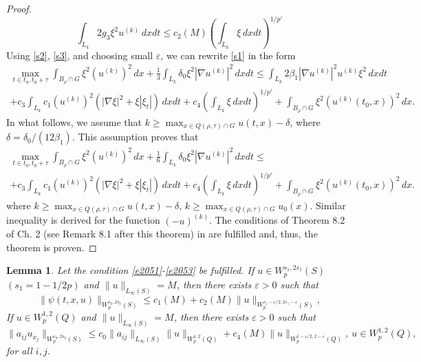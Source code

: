 \documentclass{article}
\theoremstyle{plain}
\newtheorem{lemma}{Lemma}
\begin{document}
\begin{proof}
\begin{equation}\label{s3}
\int_{L_k} 2g_3\xi^2  u^{(k)} \,dxdt\leq c_2(M)  (\int_{L_k}\xi\,dxdt )^{1/p'}
\end{equation} 
Using  \eqref{s2},   \eqref{s3}, and choosing small  $\varepsilon$, we can rewrite   \eqref{s1} in the form 
\begin{multline}\label{s4}
\max_{t\in t_0,t_0+\tau} \int_{B_\rho\cap G}\xi^2 (u^{(k)})^2\,dx +
\frac{1}{3} \int_{L_k} \delta_0\xi^2 |\nabla u^{(k)}|^2\,dxdt \leq 
\int_{L_k} 2\beta_1|\nabla u^{(k)}|^2 u^{(k)}\xi^2\,dxdt \\
+ c_3\int_{L_k} c_1(u^{(k)})^2(|\nabla \xi|^2+\xi|\xi_t|) \,dxdt + c_4(\int_{L_k}\xi\,dxdt )^{1/p'}+\int_{B_\rho\cap G}\xi^2 (u^{(k)}(t_0,x))^2\,dx.
\end{multline}
In what follows,   we assume that   $k\geq \max_{x\in Q(\rho,\tau)\cap G}u(t,x)-\delta$, where $\delta=\delta_0/(12\beta_1)$. This assumption proves that
\begin{multline*}
\max_{t\in t_0,t_0+\tau} \int_{B_\rho\cap G}\xi^2 (u^{(k)})^2\,dx +
\frac{1}{6} \int_{L_k} \delta_0\xi^2 |\nabla u^{(k)}|^2\,dxdt \leq \\
+ c_3\int_{L_k} c_1(u^{(k)})^2(|\nabla \xi|^2+\xi|\xi_t|) \,dxdt + c_4(\int_{L_k}\xi\,dxdt )^{1/p'}+\int_{B_\rho\cap G}\xi^2 (u^{(k)}(t_0,x))^2\,dx.
\end{multline*}
where $k\geq \max_{x\in Q(\rho,\tau)\cap G}u(t,x)-\delta$,  $k\geq \max_{x\in Q(\rho,\tau)\cap G} u_0(x)$. Similar inequality is derived for 
the function  $(-u)^{(k)}$.
The conditions of Theorem 8.2 of Ch. 2 (see Remark  8.1 after this theorem)  in \cite{lad} are fulfilled and, thus, the theorem is proven. 
\end{proof}



\begin{lemma} \label{lem3} Let the condition  {\rm \eqref{e2051}-\eqref{e2053}} be fulfilled.
 If   $u\in W_p^{s_1,2s_1}(S)$ $(s_1=1-1/2p)$ and
  $\|u\|_{L_\infty(S)}=M$, then there exists  $\varepsilon>0$ such that 
  \begin{equation}\label{in1}
\|\psi(t,x,u)\|_{{W}^{s_0,2s_0}_p(S)}\leq   c_1(M)+ c_2(M)\|u\|_{{W}^{s_1-\varepsilon/2,2s_1-\varepsilon}_p(S)},
\end{equation}
 If   $u\in W_p^{1,2}(Q)$ and 
  $\|u\|_{L_\infty(S)}=M$, then there exists  $\varepsilon>0$ such that 
\begin{equation}\label{in2}
  \|a_{ij}u_{x_j}\|_{W_p^{s_0,2s_0}(S)}\leq  c_0\|a_{ij}\|_{L_\infty(S)} \|u\|_{W_p^{1, 2}(Q)}+   
 c_4(M)\|u\|_{W_p^{1-\varepsilon/2, 2-\varepsilon}(Q)},\  u\in W_p^{1,2}(Q),
   \end{equation}
   for all  $i,j$.
   \end{lemma}
\end{document}
